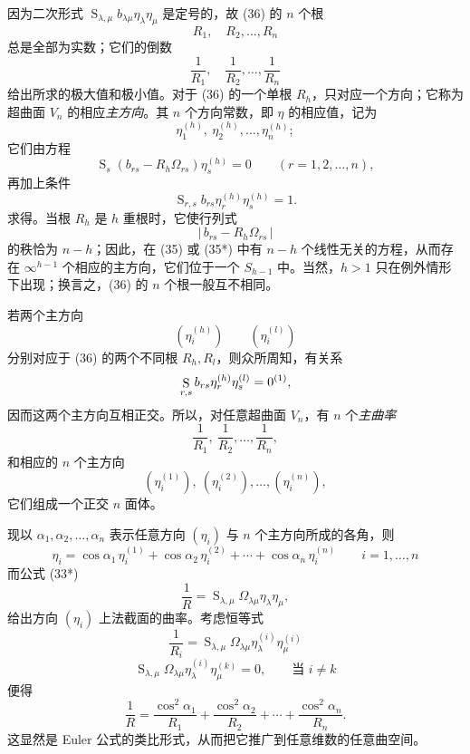 因为二次形式 \(\mathop{\mathrm{S}}_{\lambda,\mu}b_{\lambda\mu}\eta_\lambda\eta_\mu\) 是定号的，故 (36) 的 \(n\) 个根
\[
 R_1,\quad R_2,\ldots,R_n
\]
总是全部为实数；它们的倒数
\[
 \frac1{R_1},\quad \frac1{R_2},\ldots,\frac1{R_n}
\]
给出所求的极大值和极小值。对于 (36) 的一个单根 \(R_h\)，只对应一个方向；它称为超曲面 \(V_n\) 的相应\emph{主方向}。其 \(n\) 个方向常数，即 \(\eta\) 的相应值，记为
\[
 \eta_1^{(h)},\ \eta_2^{(h)},\ldots,\eta_n^{(h)};
\]
它们由方程
\[
\tag{35*}
 \mathop{\mathrm{S}}_s(b_{rs}-R_h\Omega_{rs})\eta_s^{(h)}=0\qquad (r=1,2,\ldots,n),
\]
再加上条件
\[
 \mathop{\mathrm{S}}_{r,s}b_{rs}\eta_r^{(h)}\eta_s^{(h)}=1.
\]
求得。当根 \(R_h\) 是 \(h\) 重根时，它使行列式
\[
 |\,b_{rs}-R_h\Omega_{rs}\,|
\]
的秩恰为 \(n-h\)；因此，在 (35) 或 (35*) 中有 \(n-h\) 个线性无关的方程，从而存在 \(\infty^{h-1}\) 个相应的主方向，它们位于一个 \(S_{h-1}\) 中。当然，\(h>1\) 只在例外情形下出现；换言之，(36) 的 \(n\) 个根一般互不相同。

若两个主方向
\[
(\eta_i^{(h)})\qquad (\eta_i^{(l)})
\]
分别对应于 (36) 的两个不同根 \(R_h,R_l\)，则众所周知，有关系
\[
 \mathop{\mathrm{S}}_{r,s}b_{rs}\eta_r^{(h)}\eta_s^{(l)}=0\srcfnmark{1},
\]
因而这两个主方向互相正交。所以，对任意超曲面 \(V_n\)，有 \(n\) 个\emph{主曲率}
\[
 \frac1{R_1},\ \frac1{R_2},\ldots,\frac1{R_n},
\]
和相应的 \(n\) 个主方向
\[
(\eta_i^{(1)}),\ (\eta_i^{(2)}),\ldots,(\eta_i^{(n)}),
\]
它们组成一个正交 \(n\) 面体。

现以 \(\alpha_1,\alpha_2,\ldots,\alpha_n\) 表示任意方向 \((\eta_i)\) 与 \(n\) 个主方向所成的各角，则
\[
 \eta_i=\cos\alpha_1\,\eta_i^{(1)}+\cos\alpha_2\,\eta_i^{(2)}+\cdots+\cos\alpha_n\,\eta_i^{(n)}
 \qquad i=1,\ldots,n
\]
而公式 (33*)
\[
 \frac1R=\mathop{\mathrm{S}}_{\lambda,\mu}\Omega_{\lambda\mu}\eta_\lambda\eta_\mu,
\]
给出方向 \((\eta_i)\) 上法截面的曲率。考虑恒等式
\[
 \frac1{R_i}=\mathop{\mathrm{S}}_{\lambda,\mu}\Omega_{\lambda\mu}\eta_\lambda^{(i)}\eta_\mu^{(i)}
\]
\[
 \mathop{\mathrm{S}}_{\lambda,\mu}\Omega_{\lambda\mu}\eta_\lambda^{(i)}\eta_\mu^{(k)}=0,\qquad \text{当 } i\ne k
\]
便得
\[
\tag{36}
 \frac1R=\frac{\cos^2\alpha_1}{R_1}+\frac{\cos^2\alpha_2}{R_2}+\cdots+
 \frac{\cos^2\alpha_n}{R_n}.
\]
这显然是 Euler 公式的类比形式，从而把它推广到任意维数的任意曲空间。

